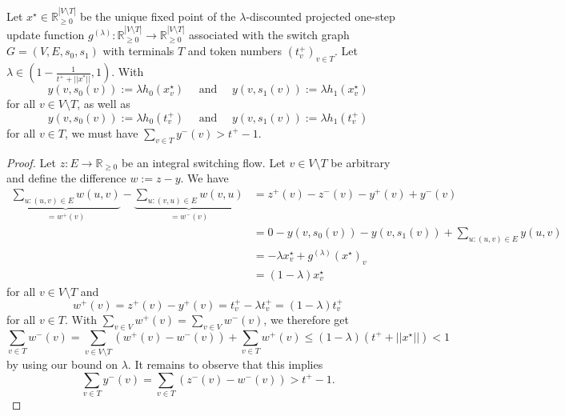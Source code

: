 \documentclass[a4paper,UKenglish,cleveref, autoref, thm-restate]{lipics-v2021}
\newcommand{\R}{\mathbb{R}}
\begin{document}
\begin{lemma}
\label{lemma:sufficient_contraction_factor}    
    Let $x^\star \in \R^{|V \setminus T|}_{\geq 0}$ be the unique fixed point of the $\lambda$-discounted projected one-step update function $g^{(\lambda)} : \R^{|V \setminus T|}_{\geq 0} \rightarrow \R^{|V \setminus T|}_{\geq 0}$ associated with the switch graph $G = (V, E, s_0, s_1)$ with terminals $T$ and token numbers $(t^+_v)_{v \in T}$. Let $\lambda \in (1 - \frac{1}{t^+ + ||x^*||}, 1)$.  With 
    \[
        y(v, s_0(v)) := \lambda h_0(x^\star_v) \quad \text{ and } \quad y(v, s_1(v)) := \lambda h_1(x^\star_v) 
    \]
    for all $v \in V \setminus T$, as well as 
    \[
        y(v, s_0(v)) := \lambda h_0(t^+_v) \quad \text{ and } \quad 
        y(v, s_1(v)) := \lambda h_1(t^+_v)
    \]
    for all $v \in T$, we must have $\sum_{v \in T} y^-(v) > t^+ - 1.$
    \end{lemma}
\begin{proof}
    Let $z : E \rightarrow \R_{\geq 0}$ be an integral switching flow. Let $v \in V \setminus T$ be arbitrary and define the difference $w := z - y$. We have 
    \begin{align*}
        \underbrace{\sum_{u: (u, v) \in E} w(u, v) }_{ = w^+(v)} - \underbrace{\sum_{u: (v, u) \in E} w(v, u)}_{ = w^-(v) } &= z^+(v) - z^-(v) - y^+(v) + y^-(v) \\
        &= 0  - y(v, s_0(v)) - y(v, s_1(v))  + \sum_{u:(u, v) \in E} y(u, v) \\
        &= - \lambda x^\star_v  + g^{(\lambda)}(x^\star)_v \\
        &= (1 - \lambda) x^\star_v
    \end{align*}
    for all $v \in V \setminus T$ and 
    \[
        w^+(v) = z^+(v) - y^+(v)  = t^+_v - \lambda t^+_v  = (1 - \lambda) t^+_v
    \]
    for all $v \in T$. With $\sum_{v \in V} w^+(v) = \sum_{v \in V} w^-(v)$, we therefore get
    \[
        \sum_{v \in T}  w^-(v) = \sum_{v \in V \setminus T} (w^+(v) - w^-(v)) + \sum_{v \in T} w^+(v)  \leq (1 - \lambda) (t^+ + ||x^\star||) < 1
    \]
    by using our bound on $\lambda$.
    It remains to observe that this implies
    \[
        \sum_{v \in T} y^-(v) = \sum_{v \in T} (z^-(v) - w^-(v)) > t^+ - 1.
    \]
\end{proof}
\end{document}
